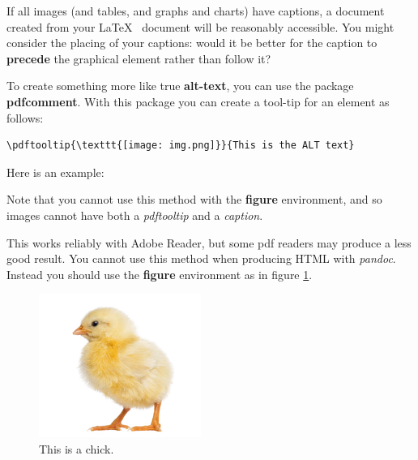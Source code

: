 \documentclass[]{article}
\begin{document}
If all images (and tables, and graphs and charts) have captions, a
document created from your \LaTeX~ document will be reasonably
accessible. You might consider the placing of your captions: would it be
better for the caption to \textbf{precede} the graphical element rather
than follow it?

To create something more like true \textbf{alt-text}, you can use the
package \textbf{pdfcomment}. With this package you can create a tool-tip
for an element as follows:

\begin{verbatim}
\pdftooltip{\texttt{[image: img.png]}}{This is the ALT text}
\end{verbatim}

Here is an example:


Note that you cannot use this method with the \textbf{figure} environment, and so
images cannot have both a \emph{pdftooltip} and a \emph{caption}.

This works reliably with Adobe Reader, but some pdf readers may produce
a less good result.  You cannot use this method when producing HTML with \emph{pandoc}.
Instead you should use the \textbf{figure} environment as in figure \ref{chick}.

\begin{figure}

\includegraphics{chick.jpg}
\caption{This is a chick.}
\label{chick}
\end{figure}
\end{document}

